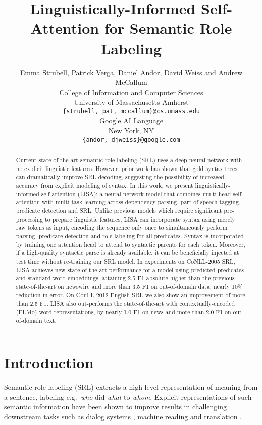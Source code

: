 \documentclass[11pt,a4paper]{article}
\title{Linguistically-Informed Self-Attention for Semantic Role Labeling}
\author{Emma Strubell, Patrick Verga, Daniel Andor, David Weiss and Andrew McCallum \\
  College of Information and Computer Sciences \\
    University of Massachusetts Amherst \\
    {\tt \{strubell, pat, mccallum\}@cs.umass.edu} \\
  Google AI Language \\
  New York, NY \\
  {\tt\{andor, djweiss\}@google.com}}
\date{}
\begin{document}
\maketitle
\begin{abstract}
Current state-of-the-art semantic role labeling (SRL) uses a deep neural network with no explicit linguistic features. 
However, prior work has shown that gold syntax trees can dramatically improve SRL decoding, suggesting the possibility of increased accuracy from explicit modeling of syntax.
In this work, we present linguistically-informed self-attention (LISA): a neural network model that combines multi-head self-attention with multi-task learning across dependency parsing, part-of-speech tagging, predicate detection and SRL.  Unlike previous models which require significant pre-processing to prepare linguistic features, LISA can incorporate syntax using merely raw tokens as input, encoding the sequence only once to simultaneously perform parsing, predicate detection and role labeling for all predicates. Syntax is incorporated by training one attention head to attend to syntactic parents for each token. Moreover, if a high-quality syntactic parse is already available, it can be beneficially injected at test time without re-training our SRL model.
In experiments on CoNLL-2005 SRL, LISA achieves new state-of-the-art performance for a model using predicted predicates and standard word embeddings, attaining 2.5 F1 absolute higher than the previous state-of-the-art on newswire and more than 3.5 F1 on out-of-domain data, nearly 10\% reduction in error. On ConLL-2012 English SRL we also show an improvement of more than 2.5 F1. LISA also out-performs the state-of-the-art with contextually-encoded (ELMo) word representations, by nearly 1.0 F1 on news and more than 2.0 F1 on out-of-domain text.
\end{abstract}

\section{Introduction}
Semantic role labeling (SRL) extracts a high-level representation of meaning from a sentence, labeling e.g.\ \emph{who} did \emph{what} to \emph{whom}. Explicit representations of such semantic information have been shown to improve results in challenging downstream tasks such as dialog systems \citep{tur2005semi,chen2013unsupervised}, machine reading \citep{berant2014modeling, wang2015machine} and translation \citep{liu2010semantic,bazrafshan2013semantic}. 
\end{document}
